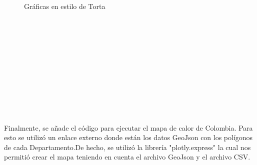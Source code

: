 \documentclass[conference,compsoc,onecolumn]{IEEEtran}
\begin{document}
\begin{figure}[htbp]
\centering
{}
\caption{ Gráficas en estilo de Torta} \label{fig:lego}
\end{figure}
\\\
\\\
\\\
\\\
\\\
\\\
\\\
\\\
\\\

Finalmente, se añade el código para ejecutar el mapa de calor de Colombia. Para esto se utilizó un enlace externo donde están los datos GeoJson con los polígonos de cada Departamento.De hecho, se utilizó la librería  "plotly.express" la cual nos permitió crear el mapa teniendo en cuenta el archivo GeoJson y el archivo CSV.
\\\
\end{document}
